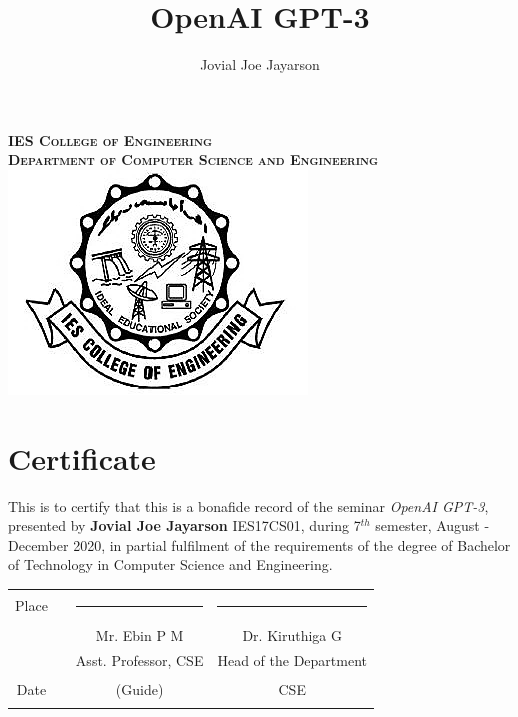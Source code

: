 \documentclass[12pt, a4paper]{report}
\title{OpenAI GPT-3}
\author{Jovial Joe Jayarson}
\begin{document}

\maketitle

\newpage

\begin{center}

    \textbf{\textsc{IES College of Engineering}}\\[0.5cm]
    \textbf{\textsc{Department of Computer Science and Engineering}}\\[2.0cm]
    \includegraphics{iesce.png}
    \section*{Certificate}
    \vspace{1cm}
\end{center}

This is to certify that this is a bonafide record of the seminar \emph{OpenAI GPT-3}, presented by \textbf{Jovial Joe Jayarson} IES17CS01, during 7$^{th}$ semester, August - December 2020, in partial fulfilment of the requirements of the degree of Bachelor of Technology in Computer Science and Engineering.\\[1.0cm]

\vfill

\begin{table}[h]
    \centering
    \begin{tabular}{ c c c c }
        Place & \rule{2cm}{0.15mm} & \rule{5cm}{0.15mm}   & \rule{5cm}{0.15mm}     \\
              &                    & Mr. Ebin P M         & Dr. Kiruthiga G        \\
              &                    & Asst. Professor, CSE & Head of the Department \\
        Date  & \rule{2cm}{0.15mm} & (Guide)              & CSE                    \\
    \end{tabular}
\end{table}
\end{document}
